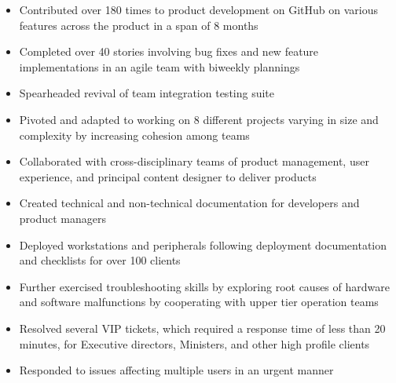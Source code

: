 \documentclass[10pt,a4paper,ragged2e]{altacv}
\begin{document}
\divider

\begin{itemize}
    \item Contributed over 180 times to product development on GitHub on various features across the product in a span of 8 months
    \item Completed over 40 stories involving bug fixes and new feature implementations in an agile team with biweekly plannings
    \item Spearheaded revival of team integration testing suite
    \item Pivoted and adapted to working on 8 different projects varying in size and complexity by increasing cohesion among teams
    \item Collaborated with cross-disciplinary teams of product management, user experience, and principal content designer to deliver products
    \item Created technical and non-technical documentation for developers and product managers
    
\end{itemize}

\divider

\begin{itemize}
    \item Deployed workstations and peripherals following deployment documentation and checklists for over 100 clients
    \item Further exercised troubleshooting skills by exploring root causes of hardware and software malfunctions by cooperating with upper tier operation teams
    \item Resolved several VIP tickets, which required a response time of less than 20 minutes, for Executive directors, Ministers, and other high profile clients
    \item Responded to issues affecting multiple users in an urgent manner
\end{itemize}
\end{document}
